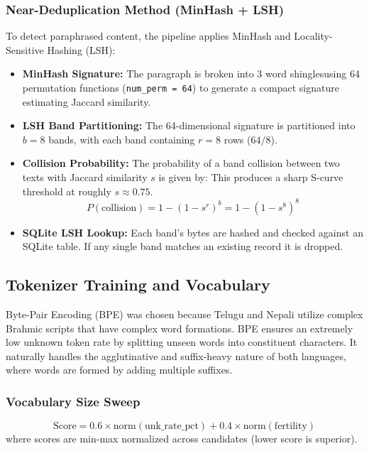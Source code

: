 \documentclass[8pt]{article}
\begin{document}
\subsubsection{Near-Deduplication Method (MinHash + LSH)}
To detect paraphrased content, the pipeline applies MinHash and Locality-Sensitive Hashing (LSH):
\begin{itemize}
    \item \textbf{MinHash Signature:} The paragraph is broken into 3 word shinglesusing 64 permutation functions (\texttt{num\_perm = 64}) to generate a compact signature estimating Jaccard similarity.
    \item \textbf{LSH Band Partitioning:} The 64-dimensional signature is partitioned into $b = 8$ bands, with each band containing $r = 8$ rows ($64 / 8$). 
    \item \textbf{Collision Probability:} The probability of a band collision between two texts with Jaccard similarity $s$ is given by: This produces a sharp S-curve threshold at roughly $s \approx 0.75$.
    \begin{equation}
        P(\text{collision}) = 1 - (1 - s^r)^b = 1 - (1 - s^8)^8
    \end{equation}
    
    \item \textbf{SQLite LSH Lookup:} Each band's bytes are hashed and checked against an SQLite table. If any single band matches an existing record it is dropped.
\end{itemize}



\subsection{Tokenizer Training and Vocabulary}
\label{sec:tokenizer}
Byte-Pair Encoding (BPE) was chosen because Telugu and Nepali utilize complex Brahmic scripts that have complex word formations. BPE ensures an extremely low unknown token rate by splitting unseen words into constituent characters. It naturally handles the agglutinative and suffix-heavy nature of both languages, where words are formed by adding multiple suffixes.

\subsubsection{Vocabulary Size Sweep}
    \begin{equation}
        \text{Score} = 0.6 \times \text{norm}(\text{unk\_rate\_pct}) + 0.4 \times \text{norm}(\text{fertility})
    \end{equation}
    where scores are min-max normalized across candidates (lower score is superior).
\end{document}
